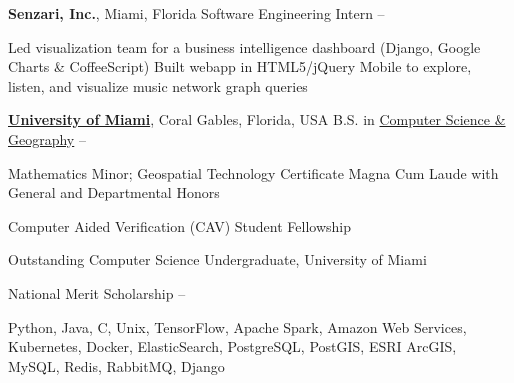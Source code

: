 \documentclass[letterpaper,MMMyyyy,nonstopmode]{simpleresumecv}
\begin{document}
\begin{Body}
\Entry
\textbf{Senzari, Inc.}, Miami, Florida
\Gap
\BulletItem
Software Engineering Intern
\hfill
{} -- 
\begin{Detail}
\SubBulletItem Led visualization team for a business intelligence dashboard (Django, Google Charts \& CoffeeScript)
\SubBulletItem Built webapp in HTML5/jQuery Mobile to explore, listen, and visualize music network graph queries
\end{Detail}



\Entry
\href{http://welcome.miami.edu/}{\textbf{University of Miami}},
Coral Gables, Florida, USA
\Gap
\BulletItem
B.S. in \href{http://www.as.miami.edu/csc/}{Computer Science \& Geography}
\hfill
{} -- 
\begin{Detail}
\SubBulletItem Mathematics Minor; Geospatial Technology Certificate
\SubBulletItem Magna Cum Laude with General and Departmental Honors
\end{Detail}



\Gap
\BulletItem Computer Aided Verification (CAV) Student Fellowship
\hfill
{}

\Gap
\BulletItem Outstanding Computer Science Undergraduate, University of Miami
\hfill
{}

\Gap
\BulletItem National Merit Scholarship
\hfill
{} -- 


\Entry Python, Java, C, Unix, TensorFlow, Apache Spark, Amazon Web Services, Kubernetes, Docker, ElasticSearch, PostgreSQL, PostGIS, ESRI ArcGIS, MySQL, Redis, RabbitMQ, Django

\end{Body}
\end{document}
